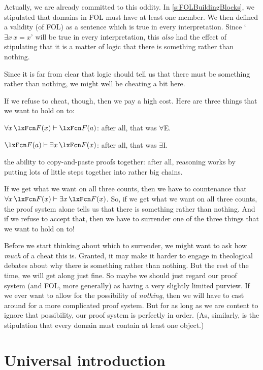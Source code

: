 Actually, we are already committed to this oddity. In \cref{s:FOLBuildingBlocks}, we stipulated that domains in FOL must have at least one member. We then defined a validity (of FOL) as a sentence which is true in every interpretation. Since `$\exists x\, x=x$' will be true in every interpretation, this \emph{also} had the effect of stipulating that it is a matter of logic that there is something rather than nothing.

Since it is far from clear that logic should tell us that there must be something rather than nothing, we might well be cheating a bit here.

If we refuse to cheat, though, then we pay a high cost. Here are three things that we want to hold on to:
	\begin{compactlist}
		\item $\forall x\,\atom{F}{x} \proves \atom{F}{a}$: after all, that was $\forall$E.
		\item $\atom{F}{a} \proves \exists x\,\atom{F}{x}$: after all, that was $\exists$I.
		\item the ability to copy-and-paste proofs together: after all, reasoning works by putting lots of little steps together into rather big chains.
	\end{compactlist}
If we get what we want on all three counts, then we have to countenance that $\forall x\,\atom{F}{x} \proves \exists x\,\atom{F}{x}$. So, if we get what we want on all three counts, the proof system alone tells us that there is something rather than nothing. And if we refuse to accept that, then we have to surrender one of the three things that we want to hold on to!

Before we start thinking about which to surrender, we might want to ask how \emph{much} of a cheat this is. Granted, it may make it harder to engage in theological debates about why there is something rather than nothing. But the rest of the time, we will get along just fine. So maybe we should just regard our proof system (and FOL, more generally) as having a very slightly limited purview. If we ever want to allow for the possibility of \emph{nothing}, then we will have to cast around for a more complicated proof system. But for as long as we are content to ignore that possibility, our proof system is perfectly in order. (As, similarly, is the stipulation that every domain must contain at least one object.)

\section{Universal introduction}\label{s:forallIntro}

